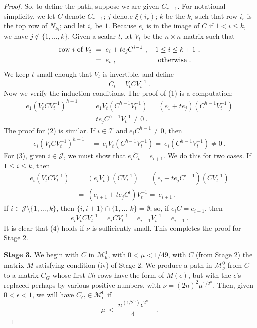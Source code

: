 \documentclass{amsart}
\theoremstyle{definition}
\theoremstyle{remark}
\numberwithin{equation}{section}
\begin{document}
{{\begin{proof}
So, to define the path, suppose we are given $C_{r-1}$. 
For notational simplicity, we let $C$ denote $C_{r-1}$;  
$j$ denote $\xi(i_r)$; $k$ be the $k_i$ such that row 
$i_r$ is the top row of $N_{k_i}$; and let $i_r$ be $1$. 
 Because $e_i$ is 
in the image of $C$ if $1< i\leq k$, we have $j\notin \{ 1, \dots , k\}$. 
Given a scalar $t$, let $V_t$ be the $n\times n$ matrix such that 
\begin{align*} 
\textnormal{row } i \textnormal{ of } V_t \ &= \ e_i + te_jC^{i-1}\ , \quad 
1\leq i \leq k+1 \ , \\ 
&= \  e_i\ , \qquad \qquad \quad \quad \textnormal{otherwise} \ . 
\end{align*} 
We keep $t$ small enough that $V_t$ is invertible, 
and define 
\[
\widetilde C_t = V_tCV_t^{-1} \ . 
\]
Now we verify the induction conditions. 
The proof of (1) is a computation: 
\begin{align*} 
e_1(V_tCV_t^{-1})^{h-1} \ &= \ 
e_1V_t(C^{h-1}V_t^{-1}) 
= \ (e_1 + te_j)( C^{h-1}V_t^{-1}) \\ 
&= \ te_jC^{h-1}V_t^{-1} \neq 0\ . 
\end{align*} 
The proof for (2) is similar. If $i\in \mathcal T$ and 
$e_iC^{h-1}\neq 0$, then 
\begin{align*}  
e_i(V_tCV_t^{-1})^{h-1} \ &= \ 
e_iV_t(C^{h-1}V_t^{-1})  
= \ e_i(C^{h-1}V_t^{-1})  \neq 0\ . 
\end{align*} 
For (3), given $i\in \mathcal J$, we must show 
that $e_i\widetilde{C_t} = e_{i+1}$. 
We do this for two cases. 
If $1\leq i \leq k$, then 
\begin{align*} 
e_i(V_tCV_t^{-1}) \ &= \ 
 (e_iV_t)(CV_t^{-1}) \ = \ 
( e_i + te_jC^{i-1})(CV_t^{-1}) \\ 
\ &= \ 
 (e_{i+1} + te_jC^{i})V_t^{-1} 
= \ e_{i+1} \ . 
\end{align*} 
If $i\in \mathcal J\setminus \{1, \dots , k\}$, 
then $\{i,i+1\}\cap  \{ 1, \dots , k\}=\emptyset$; 
so, if  
$e_iC = e_{i+1}$, then  
\[
e_iV_tCV_t^{-1} = 
e_iCV_t^{-1} = 
e_{i+1}V_t^{-1} = 
e_{i+1} \ . 
\] 
It is clear that (4) holds if $\nu$ is sufficiently small. 
This completes the proof for Stage 2. 

{\bf Stage 3.} We begin with
 $C$ in $\mathcal M^0_{\mu}$, with $0< \mu < 1/49$, 
with $C$ (from Stage 2) the matrix $M$ 
satisfying condition (iv) of Stage 2.  
We produce a path in $\mathcal M^0_{\nu}$ 
from $C$ to a matrix $C_G$ whose first $\beta h$ rows have the 
form of $M(\epsilon )$, but with the $\epsilon $'s 
replaced perhaps by various positive numbers, 
with 
$\nu = (2n)^2\mu^{1/2^n}$.  Then, given  $0<\epsilon <1$, 
we will have 
$C_G\in \mathcal M^0_{\epsilon}$ if 
\[
\mu\  <\  \frac{n^{(1/2^n)} \epsilon^{2^n}}{4} \quad . 
\]


\end{proof}}}
\end{document}
